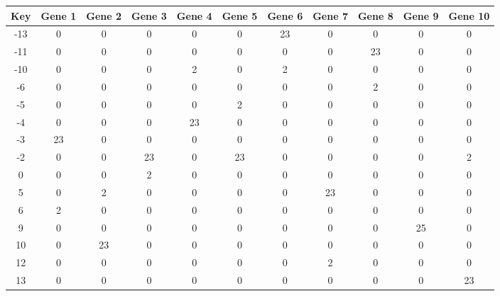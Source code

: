 \begin{tabular}{|c|c|c|c|c|c|c|c|c|c|c|}
\hline
Key & Gene 1 & Gene 2 & Gene 3 & Gene 4 & Gene 5 & Gene 6 & Gene 7 & Gene 8 & Gene 9 & Gene 10 \\
\hline
-13 & 0 & 0 & 0 & 0 & 0 & 23 & 0 & 0 & 0 & 0 \\
-11 & 0 & 0 & 0 & 0 & 0 & 0 & 0 & 23 & 0 & 0 \\
-10 & 0 & 0 & 0 & 2 & 0 & 2 & 0 & 0 & 0 & 0 \\
-6 & 0 & 0 & 0 & 0 & 0 & 0 & 0 & 2 & 0 & 0 \\
-5 & 0 & 0 & 0 & 0 & 2 & 0 & 0 & 0 & 0 & 0 \\
-4 & 0 & 0 & 0 & 23 & 0 & 0 & 0 & 0 & 0 & 0 \\
-3 & 23 & 0 & 0 & 0 & 0 & 0 & 0 & 0 & 0 & 0 \\
-2 & 0 & 0 & 23 & 0 & 23 & 0 & 0 & 0 & 0 & 2 \\
0 & 0 & 0 & 2 & 0 & 0 & 0 & 0 & 0 & 0 & 0 \\
5 & 0 & 2 & 0 & 0 & 0 & 0 & 23 & 0 & 0 & 0 \\
6 & 2 & 0 & 0 & 0 & 0 & 0 & 0 & 0 & 0 & 0 \\
9 & 0 & 0 & 0 & 0 & 0 & 0 & 0 & 0 & 25 & 0 \\
10 & 0 & 23 & 0 & 0 & 0 & 0 & 0 & 0 & 0 & 0 \\
12 & 0 & 0 & 0 & 0 & 0 & 0 & 2 & 0 & 0 & 0 \\
13 & 0 & 0 & 0 & 0 & 0 & 0 & 0 & 0 & 0 & 23 \\
\hline
\end{tabular}